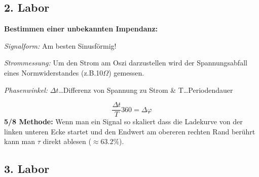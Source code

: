 \documentclass{article}
\begin{document}

\subsection*{2. Labor }
\textbf{Bestimmen einer unbekannten Impendanz:} 

\textit{Signalform:} Am besten Sinusförmig!

\textit{Strommessung:} Um den Strom am Oszi darzustellen wird der Spannungsabfall eines Normwiderstandes (z.B.10\( \Omega \)) gemessen.  %

\textit{Phasenwinkel:}  \(\Delta t \)…Differenz von Spannung zu Strom \& T…Periodendauer

\begin{equation} 
 \frac{\Delta t}{T} 360 = \Delta \varphi 
\end{equation}
\textbf{5/8 Methode:} Wenn man ein Signal so skaliert dass die Ladekurve von der linken unteren Ecke startet und den Endwert am obereren rechten Rand berührt kann man \( \tau \) direkt ablesen (\(\approx 63.2\% \)). 


\subsection*{3. Labor }
\end{document}
